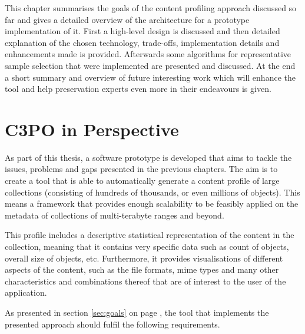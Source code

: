 This chapter summarises the goals of the content profiling approach discussed so far and gives a detailed overview of the architecture for a prototype implementation of it. First a high-level design is discussed and then detailed explanation of the chosen technology, trade-offs, implementation details and enhancements made is provided. Afterwards some algorithms for representative sample selection that were implemented are presented and discussed. At the end a short summary and overview of future interesting work which will enhance the tool and help preservation experts even more in their endeavours is given.

\section{C3PO in Perspective}
As part of this thesis, a software prototype is developed that aims to tackle the issues, problems and gaps presented in the previous chapters. The aim is to create a tool that is able to automatically generate a content profile of large collections (consisting of hundreds of thousands, or even millions of objects). This means a framework that provides enough scalability to be feasibly applied on the metadata of collections of multi-terabyte ranges and beyond.

This profile includes a descriptive statistical representation of the content in the collection, meaning that it contains very specific data such as count of objects, overall size of objects, etc. Furthermore, it provides visualisations of different aspects of the content, such as the file formats, mime types and many other characteristics and combinations thereof that are of interest to the user of the application.

As presented in section \ref{sec:goals} on page \pageref{sec:goals}, the tool that implements the presented approach should fulfil the following requirements.

